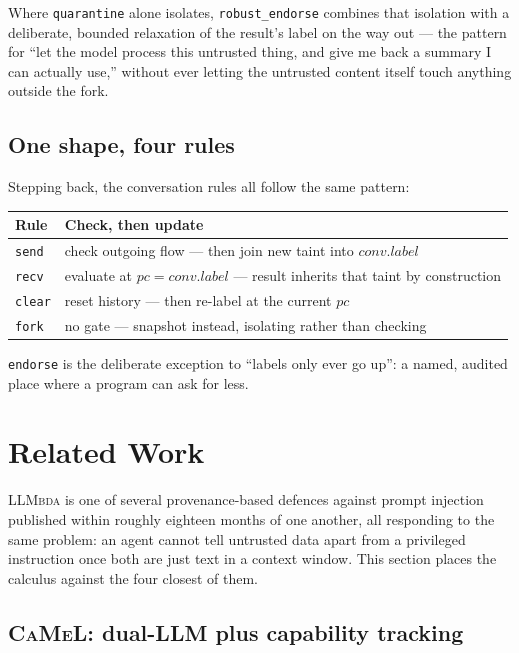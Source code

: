 \documentclass[11pt, a4paper]{article}
\newcommand{\LLMbda}{\textsc{LLMbda}\xspace}
\newcommand{\CaMeL}{\textsc{CaMeL}\xspace}
\begin{document}
Where \lstinline{quarantine} alone isolates, \lstinline{robust_endorse}
combines that isolation with a deliberate, bounded relaxation of the
result's label on the way out --- the pattern for ``let the model process
this untrusted thing, and give me back a summary I can actually use,''
without ever letting the untrusted content itself touch anything outside
the fork.

\subsection{One shape, four rules}

Stepping back, the conversation rules all follow the same pattern:

\begin{tabular}{@{}ll@{}}
\toprule
Rule & Check, then update \\
\midrule
\texttt{send} & check outgoing flow --- then join new taint into $\mathit{conv}.\mathit{label}$ \\
\texttt{recv} & evaluate at $pc = \mathit{conv}.\mathit{label}$ --- result inherits that taint by construction \\
\texttt{clear} & reset history --- then re-label at the current $pc$ \\
\texttt{fork} & no gate --- snapshot instead, isolating rather than checking \\
\bottomrule
\end{tabular}

\lstinline{endorse} is the deliberate exception to ``labels only ever go
up'': a named, audited place where a program can ask for less.

\section{Related Work}
\label{sec:related-work}

\LLMbda is one of several provenance-based defences against prompt
injection published within roughly eighteen months of one another, all
responding to the same problem: an agent cannot tell untrusted data
apart from a privileged instruction once both are just text in a
context window. This section places the calculus against the four
closest of them.

\subsection{\CaMeL: dual-LLM plus capability tracking}
\end{document}
